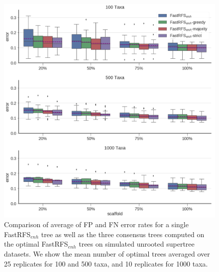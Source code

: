 \begin{figure}
  \centering
  \includegraphics[width=\textwidth]{siesta-supp-figs/fastrfs-enh-consensus-comparison-mult_only}
  \caption[Comparison of  average of FP and FN error rates for  a single FastRFS$_{enh}$ tree as well as the three consensus trees on simulated unrooted supertree datasets]{Comparison of  average of FP and FN error rates for  a single FastRFS$_{enh}$ tree as well as the three consensus trees computed on the optimal FastRFS$_{enh}$ trees on simulated
    unrooted supertree datasets. We show the mean number of optimal
    trees averaged over 25 replicates for 100 and 500 taxa, and 10
    replicates for 1000 taxa.}
  \label{fig:supertree-consensus-comparison-1}
\end{figure}



